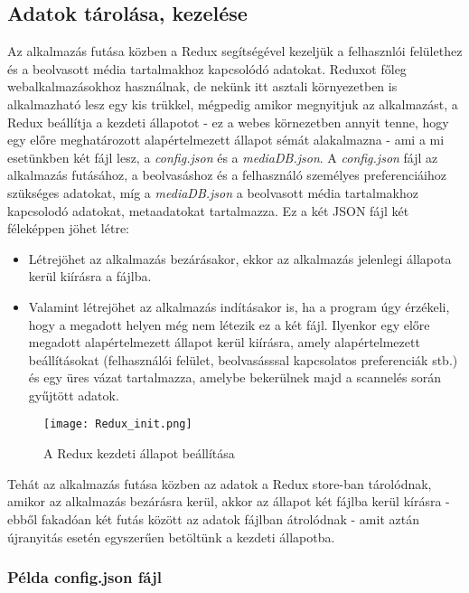 \subsection{Adatok tárolása, kezelése}
Az alkalmazás futása közben a Redux segítségével kezeljük a felhasznlói felülethez és a beolvasott média tartalmakhoz kapcsolódó adatokat. Reduxot főleg webalkalmazásokhoz használnak, de nekünk itt asztali környezetben is alkalmazható lesz egy kis trükkel, mégpedig amikor megnyitjuk az alkalmazást, a Redux beállítja a kezdeti állapotot - ez a webes körnezetben annyit tenne, hogy egy előre meghatározott alapértelmezett állapot sémát alakalmazna - ami a mi esetünkben két fájl lesz, a {\it config.json} és a {\it mediaDB.json}. A {\it config.json} fájl az alkalmazás futásához, a beolvasáshoz és a felhasználó személyes preferenciáihoz szükséges adatokat, míg a {\it mediaDB.json} a beolvasott média tartalmakhoz kapcsolodó adatokat, metaadatokat tartalmazza. Ez a két JSON fájl két féleképpen jöhet létre:
\begin{itemize}
    \item Létrejöhet az alkalmazás bezárásakor, ekkor az alkalmazás jelenlegi állapota kerül kiírásra a fájlba.
    \item Valamint létrejöhet az alkalmazás indításakor is, ha a program úgy érzékeli, hogy a megadott helyen még nem létezik ez a két fájl. Ilyenkor egy előre megadott alapértelmezett állapot kerül kiírásra, amely alapértelmezett beállításokat (felhasználói felület, beolvasásssal kapcsolatos preferenciák stb.) és egy üres vázat tartalmazza, amelybe bekerülnek majd a scannelés során gyűjtött adatok.
\end{itemize}

\begin{figure}[H]
	\centering
	\texttt{[image: Redux\_init.png]}
	\caption{A Redux kezdeti állapot beállítása}
	\label{fig:redux-init}
\end{figure}

Tehát az alkalmazás futása közben az adatok a Redux store-ban tárolódnak, amikor az alkalmazás bezárásra kerül, akkor az állapot két fájlba kerül kírásra - ebből fakadóan két futás között az adatok fájlban átrolódnak - amit aztán újranyitás esetén egyszerűen betöltünk a kezdeti állapotba.

\subsubsection{Példa config.json fájl}

